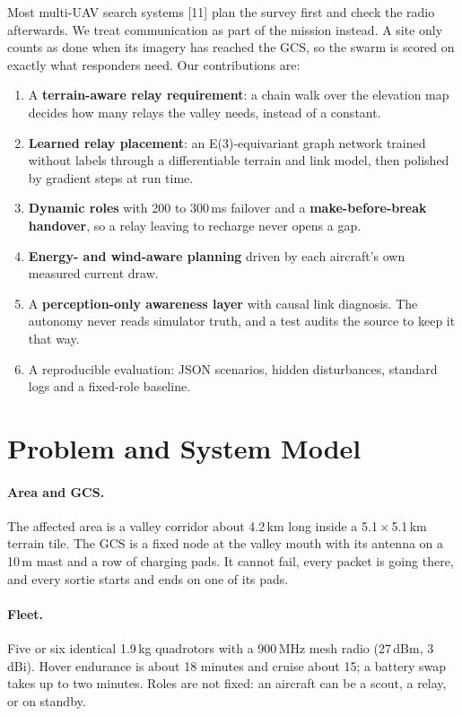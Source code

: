 \documentclass[10pt,a4paper,twocolumn]{article}
\begin{document}
Most multi-UAV search systems [11] plan the survey first and check the radio afterwards. We treat communication as part of the mission instead. A site only counts as done when its imagery has reached the GCS, so the swarm is scored on exactly what responders need. Our contributions are:
\begin{enumerate}
  \item A \textbf{terrain-aware relay requirement}: a chain walk over the elevation map decides how many relays the valley needs, instead of a constant.
  \item \textbf{Learned relay placement}: an E(3)-equivariant graph network trained without labels through a differentiable terrain and link model, then polished by gradient steps at run time.
  \item \textbf{Dynamic roles} with 200 to 300\,ms failover and a \textbf{make-before-break handover}, so a relay leaving to recharge never opens a gap.
  \item \textbf{Energy- and wind-aware planning} driven by each aircraft's own measured current draw.
  \item A \textbf{perception-only awareness layer} with causal link diagnosis. The autonomy never reads simulator truth, and a test audits the source to keep it that way.
  \item A reproducible evaluation: JSON scenarios, hidden disturbances, standard logs and a fixed-role baseline.
\end{enumerate}

\section{Problem and System Model}
\paragraph{Area and GCS.} The affected area is a valley corridor about 4.2\,km long inside a 5.1\,$\times$\,5.1\,km terrain tile. The GCS is a fixed node at the valley mouth with its antenna on a 10\,m mast and a row of charging pads. It cannot fail, every packet is going there, and every sortie starts and ends on one of its pads.

\paragraph{Fleet.} Five or six identical 1.9\,kg quadrotors with a 900\,MHz mesh radio (27\,dBm, 3\,dBi). Hover endurance is about 18 minutes and cruise about 15; a battery swap takes up to two minutes. Roles are not fixed: an aircraft can be a scout, a relay, or on standby.
\end{document}
